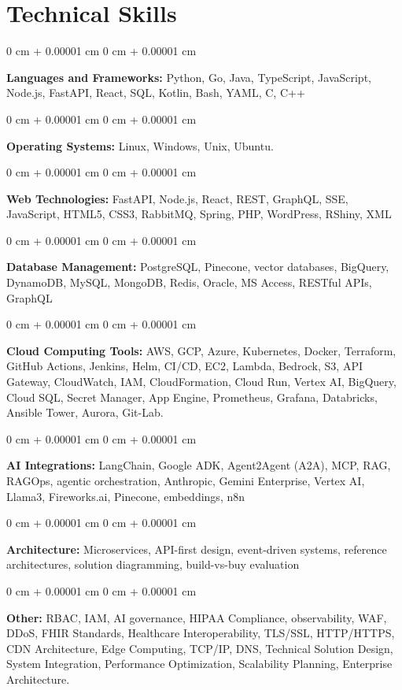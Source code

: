 \documentclass[10pt, letterpaper]{article}
\newenvironment{onecolentry}{
    \begin{adjustwidth}{
        0 cm + 0.00001 cm
    }{
        0 cm + 0.00001 cm
    }
}{
    \end{adjustwidth}
} %
\begin{document}
    \section{Technical Skills}
    \vspace{2 pt }
    \begin{onecolentry}
    \textbf{Languages and Frameworks:} Python, Go, Java, TypeScript, JavaScript, Node.js, FastAPI, React, SQL, Kotlin, Bash, YAML, C, C++
    \end{onecolentry}
    \begin{onecolentry}
        \textbf{Operating Systems:} Linux, Windows, Unix, Ubuntu.
    \end{onecolentry}
    \begin{onecolentry}
         \textbf{Web Technologies:} FastAPI, Node.js, React, REST, GraphQL, SSE, JavaScript, HTML5, CSS3, RabbitMQ, Spring, PHP, WordPress, RShiny, XML \end{onecolentry}
    \begin{onecolentry}
        \textbf{Database Management:} PostgreSQL, Pinecone, vector databases, BigQuery, DynamoDB, MySQL, MongoDB, Redis, Oracle, MS Access, RESTful APIs, GraphQL \end{onecolentry}
    \begin{onecolentry}
        \textbf{Cloud Computing Tools:}
AWS, GCP, Azure, Kubernetes, Docker, Terraform, GitHub Actions, Jenkins, Helm, CI/CD, EC2, Lambda, Bedrock, S3, API Gateway, CloudWatch, IAM, CloudFormation, Cloud Run, Vertex AI, BigQuery, Cloud SQL, Secret Manager, App Engine, Prometheus, Grafana, Databricks, Ansible Tower, Aurora, Git-Lab.
    \end{onecolentry}
    \begin{onecolentry}
         \textbf{AI Integrations:} LangChain, Google ADK, Agent2Agent (A2A), MCP, RAG, RAGOps, agentic orchestration, Anthropic, Gemini Enterprise, Vertex AI, Llama3, Fireworks.ai, Pinecone, embeddings, n8n \end{onecolentry}
    \begin{onecolentry}
        \textbf{Architecture:} Microservices, API-first design, event-driven systems, reference architectures, solution diagramming, build-vs-buy evaluation \end{onecolentry}
        \begin{onecolentry}
     \textbf{Other:} RBAC, IAM, AI governance, HIPAA Compliance, observability, WAF, DDoS, FHIR Standards, Healthcare Interoperability, TLS/SSL, HTTP/HTTPS, CDN Architecture, Edge Computing, TCP/IP, DNS, Technical Solution Design, System Integration, Performance Optimization, Scalability Planning, Enterprise Architecture.
    \end{onecolentry}
\end{document}
